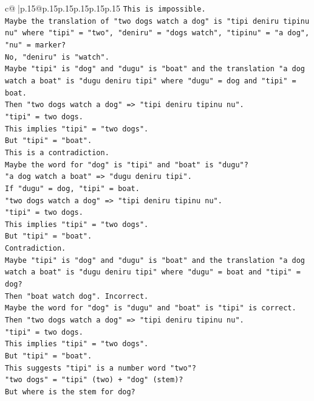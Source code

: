 \documentclass{article}
\begin{document}
{\begin{supertabular}{c@{$\;$}|p{.15\linewidth}@{}p{.15\linewidth}p{.15\linewidth}p{.15\linewidth}p{.15\linewidth}p{.15\linewidth}}
{{{\texttt{This is impossible.} \\
\texttt{Maybe the translation of "two dogs watch a dog" is "tipi deniru tipinu nu" where "tipi" = "two", "deniru" = "dogs watch", "tipinu" = "a dog", "nu" = marker?} \\
\texttt{No, "deniru" is "watch".} \\
\texttt{Maybe "tipi" is "dog" and "dugu" is "boat" and the translation "a dog watch a boat" is "dugu deniru tipi" where "dugu" = dog and "tipi" = boat.} \\
\texttt{Then "two dogs watch a dog" => "tipi deniru tipinu nu".} \\
\texttt{"tipi" = two dogs.} \\
\texttt{This implies "tipi" = "two dogs".} \\
\texttt{But "tipi" = "boat".} \\
\texttt{This is a contradiction.} \\
\texttt{Maybe the word for "dog" is "tipi" and "boat" is "dugu"?} \\
\texttt{"a dog watch a boat" => "dugu deniru tipi".} \\
\texttt{If "dugu" = dog, "tipi" = boat.} \\
\texttt{"two dogs watch a dog" => "tipi deniru tipinu nu".} \\
\texttt{"tipi" = two dogs.} \\
\texttt{This implies "tipi" = "two dogs".} \\
\texttt{But "tipi" = "boat".} \\
\texttt{Contradiction.} \\
\texttt{Maybe "tipi" is "dog" and "dugu" is "boat" and the translation "a dog watch a boat" is "dugu deniru tipi" where "dugu" = boat and "tipi" = dog?} \\
\texttt{Then "boat watch dog". Incorrect.} \\
\texttt{Maybe the word for "dog" is "dugu" and "boat" is "tipi" is correct.} \\
\texttt{Then "two dogs watch a dog" => "tipi deniru tipinu nu".} \\
\texttt{"tipi" = two dogs.} \\
\texttt{This implies "tipi" = "two dogs".} \\
\texttt{But "tipi" = "boat".} \\
\texttt{This suggests "tipi" is a number word "two"?} \\
\texttt{"two dogs" = "tipi" (two) + "dog" (stem)?} \\
\texttt{But where is the stem for dog?} \\
}}}
\end{supertabular}}
\end{document}
